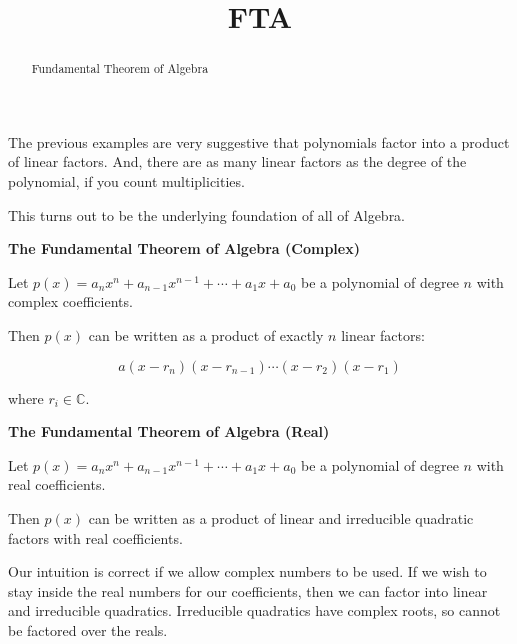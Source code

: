 \documentclass{ximera}
\title{FTA}
\begin{document}
\begin{abstract}
Fundamental Theorem of Algebra
\end{abstract}
\maketitle









The previous examples are very suggestive that polynomials factor into a product of linear factors.  And, there are as many linear factors as the degree of the polynomial, if you count multiplicities. 



This turns out to be the underlying foundation of all of Algebra. 




\begin{theorem} \textbf{\textcolor{green!50!black}{The Fundamental Theorem of Algebra (Complex)}} 



Let $p(x) = a_n x^n + a_{n-1} x^{n-1} + \cdots + a_1 x + a_0$ be a polynomial of degree $n$ with complex coefficients. 


Then $p(x)$ can be written as a product of exactly $n$ linear factors:

\[
 a (x - r_n) (x - r_{n-1}) \cdots (x - r_2)  (x - r_1) 
\]


where $r_i \in \mathbb{C}$.


\end{theorem}








\begin{theorem} \textbf{\textcolor{green!50!black}{The Fundamental Theorem of Algebra (Real)}} 



Let $p(x) = a_n x^n + a_{n-1} x^{n-1} + \cdots + a_1 x + a_0$ be a polynomial of degree $n$ with real coefficients. 


Then $p(x)$ can be written as a product of linear and irreducible quadratic factors with real coefficients.


\end{theorem}


Our intuition is correct if we allow complex numbers to be used.  If we wish to stay inside the real numbers for our coefficients, then we can factor into linear and irreducible quadratics.  Irreducible quadratics have complex roots, so cannot be factored over the reals.
\end{document}
